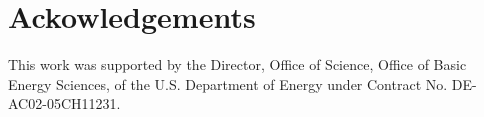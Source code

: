 \documentclass{iucr}
\begin{document}

\section{Ackowledgements}       
 
 
This work was supported by the Director, Office of Science, Office of Basic Energy Sciences, of the U.S. Department of Energy under Contract No. DE-AC02-05CH11231.
 
\end{document}

